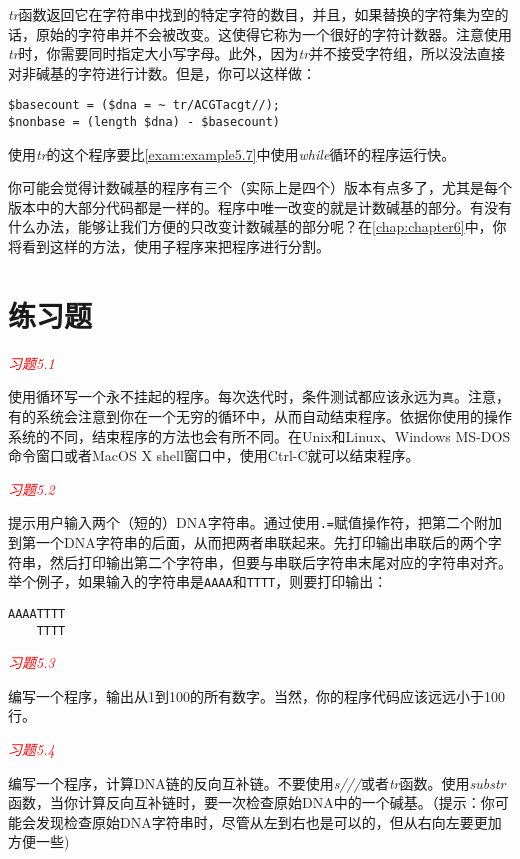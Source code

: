 \textit{tr}函数返回它在字符串中找到的特定字符的数目，并且，如果替换的字符集为空的话，原始的字符串并不会被改变。这使得它称为一个很好的字符计数器。注意使用\textit{tr}时，你需要同时指定大小写字母。此外，因为\textit{tr}并不接受字符组，所以没法直接对非碱基的字符进行计数。但是，你可以这样做：

\begin{lstlisting}
$basecount = ($dna = ~ tr/ACGTacgt//);
$nonbase = (length $dna) - $basecount)
\end{lstlisting}

使用\textit{tr}的这个程序要比\autoref{exam:example5.7}中使用\textit{while}循环的程序运行快。

你可能会觉得计数碱基的程序有三个（实际上是四个）版本有点多了，尤其是每个版本中的大部分代码都是一样的。程序中唯一改变的就是计数碱基的部分。有没有什么办法，能够让我们方便的只改变计数碱基的部分呢？在\autoref{chap:chapter6}中，你将看到这样的方法，使用子程序来把程序进行分割。

\section{练习题}
\textcolor{red}{\textit{习题5.1}}
\begin{adjustwidth}{1cm}{}
使用循环写一个永不挂起的程序。每次迭代时，条件测试都应该永远为\verb|真|。注意，有的系统会注意到你在一个无穷的循环中，从而自动结束程序。依据你使用的操作系统的不同，结束程序的方法也会有所不同。在Unix和Linux、Windows
MS-DOS命令窗口或者MacOS X shell窗口中，使用Ctrl-C就可以结束程序。
\end{adjustwidth}

\textcolor{red}{\textit{习题5.2}}
\begin{adjustwidth}{1cm}{}
提示用户输入两个（短的）DNA字符串。通过使用\verb|.=|赋值操作符，把第二个附加到第一个DNA字符串的后面，从而把两者串联起来。先打印输出串联后的两个字符串，然后打印输出第二个字符串，但要与串联后字符串末尾对应的字符串对齐。举个例子，如果输入的字符串是\verb|AAAA|和\verb|TTTT|，则要打印输出：
\begin{verbatim}
AAAATTTT
    TTTT
\end{verbatim}
\end{adjustwidth}

\textcolor{red}{\textit{习题5.3}}
\begin{adjustwidth}{1cm}{}
编写一个程序，输出从1到100的所有数字。当然，你的程序代码应该远远小于100行。
\end{adjustwidth}

\textcolor{red}{\textit{习题5.4}}
\begin{adjustwidth}{1cm}{}
编写一个程序，计算DNA链的反向互补链。不要使用\textit{s///}或者\textit{tr}函数。使用\textit{substr}函数，当你计算反向互补链时，要一次检查原始DNA中的一个碱基。（提示：你可能会发现检查原始DNA字符串时，尽管从左到右也是可以的，但从右向左要更加方便一些) 
\end{adjustwidth}

